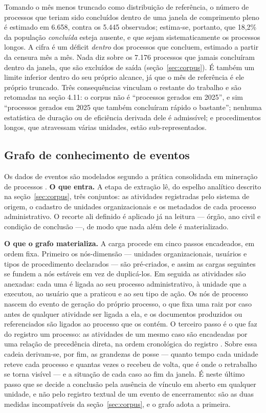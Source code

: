 

Tomando o mês menos truncado como distribuição de referência, o número de processos que teriam sido
concluídos dentro de uma janela de comprimento pleno é estimado em 6.658, contra os 5.445
observados; estima-se, portanto, que 18,2\% da população \emph{concluída} esteja ausente, e que
sejam sistematicamente os processos longos. A cifra é um déficit \emph{dentro} dos
processos que concluem, estimado a partir da censura mês a mês. Nada diz sobre os 7.176 processos
que jamais concluíram dentro da janela, que são excluídos de saída (seção~\ref{sec:corpus}). É também um limite
inferior dentro do seu próprio alcance, já que o mês de referência é ele próprio truncado. Três
consequências vinculam o restante do trabalho e são retomadas na seção 4.11: o corpus não é ``processos gerados em 2025'', e sim ``processos gerados em 2025 que também concluíram rápido o
bastante''; nenhuma estatística de duração ou de eficiência derivada dele é admissível; e
procedimentos longos, que atravessam várias unidades, estão sub-representados.

\subsection{Grafo de conhecimento de eventos}\label{sec:ekg}

Os dados de eventos são modelados segundo a prática consolidada em mineração de processos
\cite{vanderaalst2016processmining}. \textbf{O que entra.} A etapa de extração lê, do espelho
analítico descrito na seção~\ref{sec:corpus}, três conjuntos: as atividades registradas pelo sistema
de origem, o cadastro de unidades organizacionais e os metadados de cada processo administrativo. O
recorte ali definido é aplicado já na leitura --- órgão, ano civil e condição de conclusão ---, de
modo que nada além dele é materializado.

\textbf{O que o grafo materializa.} A carga procede em cinco passos encadeados, em ordem fixa.
Primeiro os nós-dimensão --- unidades organizacionais, usuários e tipos de
procedimento declarados --- são pré-criados, e assim as cargas seguintes se fundem a nós
estáveis em vez de duplicá-los. Em seguida as atividades são anexadas: cada uma é ligada ao seu
processo administrativo, à unidade que a executou, ao usuário que a praticou e ao seu tipo de ação.
Os nós de processo nascem do evento de geração do próprio processo, o que fixa uma raiz por caso
antes de qualquer atividade ser ligada a ela, e os documentos produzidos ou referenciados são
ligados ao processo que os contém. O terceiro passo é o que faz do registro um processo: as
atividades de um mesmo caso são encadeadas por uma relação de precedência direta, na ordem
cronológica do registro \cite{esser2021ekg}. Sobre essa cadeia derivam-se, por fim, as grandezas de
posse --- quanto tempo cada unidade reteve cada processo e quantas vezes o recebeu de volta, que é
onde o retrabalho se torna visível --- e a situação de cada caso ao fim da janela. É neste último
passo que se decide a conclusão pela ausência de vínculo em aberto em qualquer unidade, e não pelo
registro textual de um evento de encerramento: são as duas medidas incompatíveis da
seção~\ref{sec:corpus}, e o grafo adota a primeira.

